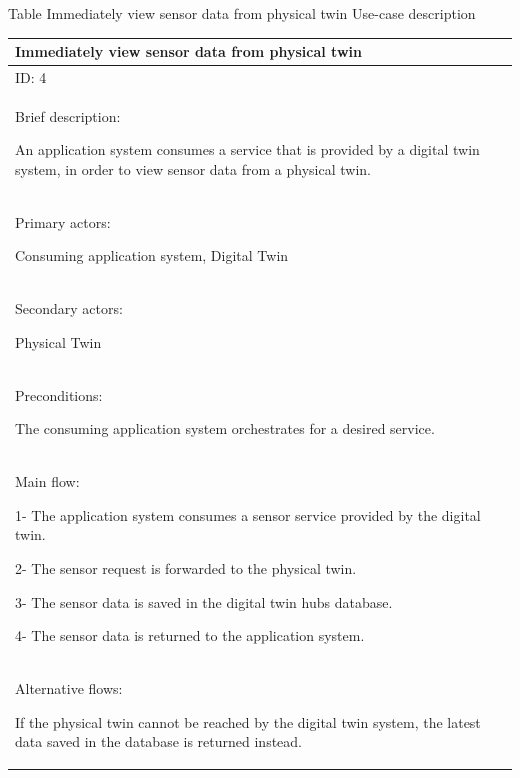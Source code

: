 \documentclass{article}
\newcounter{Table}
\renewcommand\theTable{\arabic{Table}}
\begin{document}
\newpage

Table \stepcounter{Table}{\theTable} Immediately view sensor data from physical twin Use-case description

\begin{flushleft}
\tablefirsthead{}
\tablehead{}
\tabletail{}
\tablelasttail{}
\begin{supertabular}{|m{6.01226in}|}
\hline
Immediately view sensor data from physical twin\\\hline
ID: 4 \\\hline
Brief description:

An application system consumes a service that is provided by a digital twin system, in order to view sensor data from a physical twin. \\\hline

Primary actors:

Consuming application system, Digital Twin \\\hline
Secondary actors:

Physical Twin \\\hline
Preconditions:

The consuming application system orchestrates for a desired service. \\\hline
Main flow:

1- The application system consumes a sensor service provided by the digital twin.

2- The sensor request is forwarded to the physical twin.

3- The sensor data is saved in the digital twin hubs database.

4- The sensor data is returned to the application system.

\\\hline
Alternative flows:

If the physical twin cannot be reached by the digital twin system, the latest data saved in the database is returned instead.\\\hline
\end{supertabular}
\end{flushleft}
\end{document}
